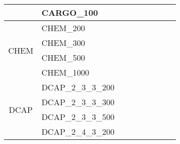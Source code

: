 \begin{table}[]
{\begin{tabular}{|c|l|l|l|l|l|l|l|l|}
			& CARGO\_100                    &                                    &                                  &                            &                          &                                         &                                 &                                \\ \hline
			\multirow{4}{*}{CHEM}    & CHEM\_200                     &                                    &                                  &                            &                          &                                         &                                 &                                \\
			& CHEM\_300                     &                                    &                                  &                            &                          &                                         &                                 &                                \\
			& CHEM\_500                     &                                    &                                  &                            &                          &                                         &                                 &                                \\
			& CHEM\_1000                    &                                    &                                  &                            &                          &                                         &                                 &                                \\ \hline
			\multirow{12}{*}{DCAP}   & DCAP\_2\_3\_3\_200            &                                    &                                  &                            &                          &                                         &                                 &                                \\
			& DCAP\_2\_3\_3\_300            &                                    &                                  &                            &                          &                                         &                                 &                                \\
			& DCAP\_2\_3\_3\_500            &                                    &                                  &                            &                          &                                         &                                 &                                \\
			& DCAP\_2\_4\_3\_200            &                                    &                                  &                            &                          &                                         &                                 &                                \\

\end{tabular}}
\end{table}
